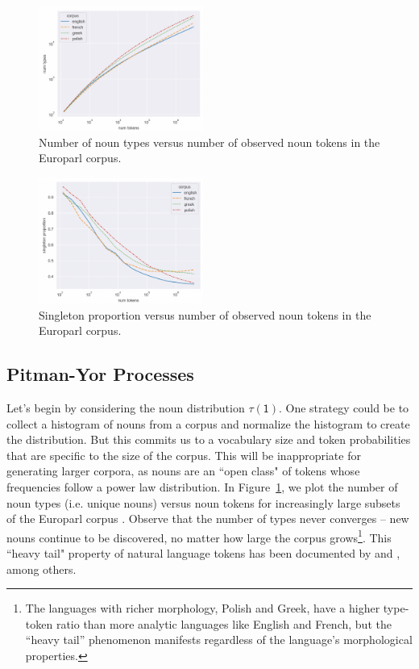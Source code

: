 \documentclass[11pt,a4paper]{article}
\renewcommand{\bnfpn}[1]{\mathsf{#1}}
\begin{document}
\begin{figure}[t]
\centering
\includegraphics[width=0.48\textwidth]{images/type_token1.png}
\caption{Number of noun types versus number of observed noun tokens in the Europarl corpus.}
\label{fig:type_token1}
\end{figure}

\begin{figure}[t]
\centering
\includegraphics[width=0.48\textwidth]{images/sp1.png}
\caption{Singleton proportion versus number of observed noun tokens in the Europarl corpus.}
\label{fig:sp1}
\end{figure}

\subsection{Pitman-Yor Processes}

Let's begin by considering the noun distribution $\tau(\bnfpn{1})$. One strategy could be to collect a histogram of nouns from a corpus and normalize the histogram to create the distribution. But this commits us to a vocabulary size and token probabilities that are specific to the size of the corpus. This will be inappropriate for generating larger corpora, as nouns are an ``open class" of tokens whose frequencies follow a power law distribution. In Figure~\ref{fig:type_token1}, we plot the number of noun types (i.e. unique nouns) versus noun tokens for increasingly large subsets of the Europarl corpus \cite{koehn-2005-europarl}. Observe that the number of types never converges -- new nouns continue to be discovered, no matter how large the corpus grows\footnote{The languages with richer morphology, Polish and Greek, have a higher type-token ratio than more analytic languages like English and French, but the ``heavy tail'' phenomenon manifests regardless of the language's morphological properties.}. This ``heavy tail" property of natural language tokens has been documented by \cite{newman2005power} and \cite{teh-2006-hierarchical}, among others.
\end{document}
